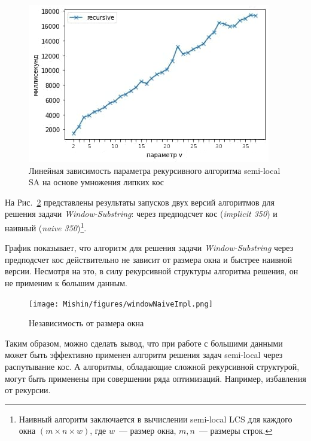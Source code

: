 \begin{figure}[t!]
\centering
    \includegraphics[width=0.8\columnwidth]{Mishin/figures/vDependenceImplicitSemiLocalSARecursie.png}
    \caption{Линейная зависимость параметра рекурсивного алгоритма {semi-local SA} на основе умножения липких кос }\label{fig:vParam}
\end{figure}

На Рис.~\ref{fig:speedWindow3} представлены результаты запусков двух версий алгоритмов для решения задачи \emph{Window-Substring}: через предподсчет кос (\emph{implicit 350}) и наивный (\emph{naive 350})\footnote{Наивный алгоритм заключается в вычислении {semi-local LCS} для каждого окна $(m \times n \times w)$, где $w$~--- размер окна, $m,n$~--- размеры строк.
}.

График  показывает, что алгоритм для решения задачи \emph{Window-Substring} через предподсчет кос действительно не зависит от размера окна и быстрее наивной версии.
Несмотря на это, в силу рекурсивной структуры  алгоритма решения, он не применим к большим данным.

\begin{figure}[t!]
\centering
    \texttt{[image: Mishin/figures/windowNaiveImpl.png]}
    \caption{Независимость от размера окна }\label{fig:speedWindow3}
\end{figure}


Таким образом, можно сделать вывод, что  при работе с большими данными может быть эффективно применен алгоритм решения задач {semi-local} через распутывание кос. 
А алгоритмы, обладающие сложной рекурсивной структурой, могут быть применены при совершении ряда оптимизаций. Например, избавления от рекурсии.


